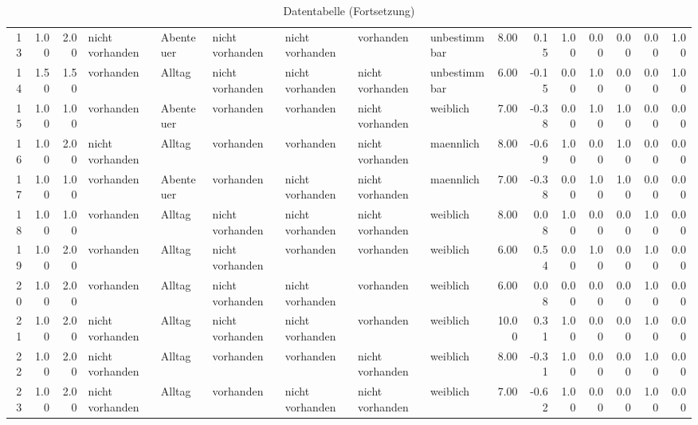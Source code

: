 \begin{table}
\begin{center}
{\begin{tabular}{rrrllllllrrrrrrr}
  13 & 1.00 & 2.00 & nicht vorhanden & Abenteuer & nicht vorhanden & nicht vorhanden & vorhanden & unbestimmbar & 8.00 & 0.15 & 1.00 & 0.00 & 0.00 & 0.00 & 1.00 \\ 
  14 & 1.50 & 1.50 & vorhanden & Alltag & nicht vorhanden & nicht vorhanden & nicht vorhanden & unbestimmbar & 6.00 & -0.15 & 0.00 & 1.00 & 0.00 & 0.00 & 1.00 \\ 
  15 & 1.00 & 1.00 & vorhanden & Abenteuer & vorhanden & vorhanden & nicht vorhanden & weiblich & 7.00 & -0.38 & 0.00 & 1.00 & 1.00 & 0.00 & 0.00 \\ 
  16 & 1.00 & 2.00 & nicht vorhanden & Alltag & vorhanden & vorhanden & nicht vorhanden & maennlich & 8.00 & -0.69 & 1.00 & 0.00 & 1.00 & 0.00 & 0.00 \\ 
  17 & 1.00 & 1.00 & vorhanden & Abenteuer & vorhanden & nicht vorhanden & nicht vorhanden & maennlich & 7.00 & -0.38 & 0.00 & 1.00 & 1.00 & 0.00 & 0.00 \\ 
  18 & 1.00 & 1.00 & vorhanden & Alltag & nicht vorhanden & nicht vorhanden & nicht vorhanden & weiblich & 8.00 & 0.08 & 1.00 & 0.00 & 0.00 & 1.00 & 0.00 \\ 
  19 & 1.00 & 2.00 & vorhanden & Alltag & nicht vorhanden & vorhanden & vorhanden & weiblich & 6.00 & 0.54 & 0.00 & 1.00 & 0.00 & 1.00 & 0.00 \\ 
  20 & 1.00 & 2.00 & vorhanden & Alltag & nicht vorhanden & nicht vorhanden & vorhanden & weiblich & 6.00 & 0.08 & 0.00 & 0.00 & 0.00 & 1.00 & 0.00 \\ 
  21 & 1.00 & 2.00 & nicht vorhanden & Alltag & nicht vorhanden & nicht vorhanden & vorhanden & weiblich & 10.00 & 0.31 & 1.00 & 0.00 & 0.00 & 1.00 & 0.00 \\ 
  22 & 1.00 & 2.00 & nicht vorhanden & Alltag & vorhanden & vorhanden & nicht vorhanden & weiblich & 8.00 & -0.31 & 1.00 & 0.00 & 0.00 & 1.00 & 0.00 \\ 
  23 & 1.00 & 2.00 & nicht vorhanden & Alltag & vorhanden & nicht vorhanden & nicht vorhanden & weiblich & 7.00 & -0.62 & 1.00 & 0.00 & 0.00 & 1.00 & 0.00 \\ 
   \hline
\end{tabular}
}
\caption{Datentabelle (Fortsetzung)}
\label{merkmale}
\end{center}
\end{table}













